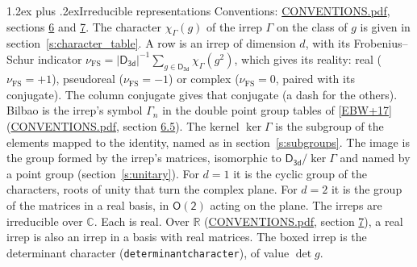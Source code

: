 \documentclass[10pt,a4paper]{article}
\makeatletter
\renewcommand\section{\@startsection{section}{1}{\z@}{-3ex plus -1ex minus -.2ex}%
  {1.2ex plus .2ex}{\normalfont\large\sffamily\bfseries\color{parttitle}}}
\numberwithin{equation}{section}
\newcommand{\grp}[1]{\mathsf{#1}}
\newcommand{\irchar}[1]{\chi_{#1}}
\newcommand{\fsind}{\nu_{\mathrm{FS}}}
\makeatother
\begin{document}
\section{Irreducible representations}\label{s:irreps}
Conventions: \href{../../CONVENTIONS.pdf}{CONVENTIONS.pdf}, sections \href{../../CONVENTIONS.pdf\#conv.6}{6} and \href{../../CONVENTIONS.pdf\#conv.7}{7}.
\leavevmode\label{n:function.character}\label{n:irrep.Gamma}The character $\irchar{\Gamma}(g)$ of the irrep $\Gamma$ on the class of $g$ is given in section~\ref{s:character_table}.
\leavevmode\label{n:index.dimension}\label{n:index.frobenius}\label{n:head.irrep}\label{n:head.reality}A row is an irrep of dimension $d$, with its Frobenius--Schur indicator $\fsind = |\grp{D_{3d}}|^{-1}\allowbreak\sum_{g\in\grp{D_{3d}}}\irchar{\Gamma}(g^2)$, which gives its reality: real ($\fsind = +1$), pseudoreal ($\fsind = -1$) or complex ($\fsind = 0$, paired with its conjugate). \label{n:head.conjugate}The column conjugate gives that conjugate (a dash for the others). \label{n:head.bilbao}\label{n:irrep.alias.gamma}Bilbao is the irrep's symbol $\Gamma_n$ in the double point group tables of [\href{../../../REFERENCES.pdf\#ref.EBW+17}{EBW+17}] (\href{../../CONVENTIONS.pdf}{CONVENTIONS.pdf}, section \href{../../CONVENTIONS.pdf\#conv.6.5}{6.5}). \label{n:head.kernel}The kernel $\ker\Gamma$ is the subgroup of the elements mapped to the identity, named as in section~\ref{s:subgroups}. \label{n:head.image}The image is the group formed by the irrep's matrices, isomorphic to $\grp{D_{3d}}/\ker\Gamma$ and named by a point group (section~\ref{s:unitary}). For $d = 1$ it is the cyclic group of the characters, roots of unity that turn the complex plane. For $d = 2$ it is the group of the matrices in a real basis, in $\grp{O(2)}$ acting on the plane. The irreps are irreducible over $\mathbb{C}$. Each is real. Over $\mathbb{R}$ (\href{../../CONVENTIONS.pdf}{CONVENTIONS.pdf}, section \href{../../CONVENTIONS.pdf\#conv.7}{7}), a real irrep is also an irrep in a basis with real matrices. \label{n:mark.determinant}The boxed irrep is the determinant character (\texttt{determinantcharacter}), of value $\det g$.
\setlength{\emergencystretch}{2em}\par\setlength{\emergencystretch}{0pt}
\end{document}
